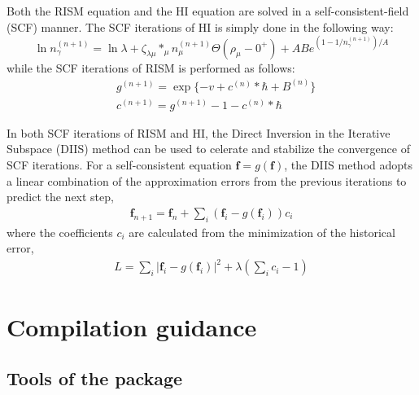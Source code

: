 \documentclass[aip,amsmath,amssymb,reprint,onecolumn]{revtex4-1}
\begin{document}
Both the RISM equation and the HI equation are solved in a self-consistent-field (SCF) manner. The SCF iterations of HI is simply done in the following way:
\begin{equation}
    \ln n_\gamma^{(n+1)} = \ln\lambda + \zeta_{\lambda\mu}*_\mu n_\mu^{(n+1)}\Theta(\rho_\mu-0^+) + ABe^{(1-1/n_\gamma^{(n+1)})/A}
\end{equation}
while the SCF iterations of RISM is performed as follows:
\begin{equation}\begin{split}
    &g^{(n+1)} = \exp\{-v + c^{(n)}*\hbar + B^{(n)}\} \\
    &c^{(n+1)} = g^{(n+1)} - 1 - c^{(n)}*\hbar
\end{split}\end{equation}

In both SCF iterations of RISM and HI, the Direct Inversion in the Iterative Subspace (DIIS) method \cite{Luchko_JCTC_2010,Gusarov_JCC_2012,Peter_CPL_1980} can be used to celerate and stabilize the convergence of SCF iterations. For a self-consistent equation $\textbf{f} = g(\textbf{f})$, the DIIS method adopts a linear combination of the approximation errors from the previous iterations to predict the next step,
\begin{equation}\begin{split}\label{eq.DIIS}
    \textbf{f}_{n+1} = \textbf{f}_{n} + \sum_i (\textbf{f}_i - g(\textbf{f}_i))c_i
\end{split}\end{equation}
where the coefficients $c_i$ are calculated from the minimization of the historical error,
\begin{equation}\begin{split}\label{eq.DIIS-Larange}
    L = \sum_i\Big|\textbf{f}_i - g(\textbf{f}_i)\Big|^2 + \lambda\left(\sum_ic_i - 1\right)
\end{split}\end{equation}


\section{Compilation guidance}

\subsection{Tools of the package}
\end{document}
